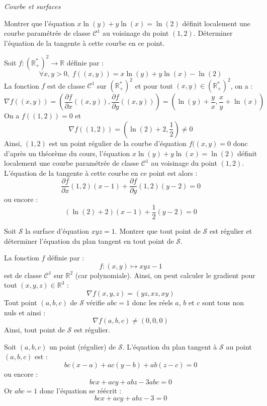 \documentclass[a4paper,10pt]{report}
\begin{document}
\medskip

\begin{center}
\textit{{ {\large Courbe et surfaces}}}
\end{center}

\medskip

\begin{Exercice}{} Montrer que l'équation $x\ln(y)+y \ln(x) = \ln(2)$ définit localement une courbe paramétrée de classe $\mathcal{C}^1$ au voisinage du point $(1,2)$. Déterminer l'équation de la tangente à cette courbe en ce point.
\end{Exercice}

\corr Soit $f : (\mathbb{R}_+^*)^2 \rightarrow \mathbb{R}$ définie par :
$$ \forall x,y>0, \; f((x,y))= x\ln(y)+y \ln(x) - \ln(2)$$
La fonction $f$ est de classe $\mathcal{C}^1$ sur  $(\mathbb{R}_+^*)^2$ et pour tout $(x,y) \in  (\mathbb{R}_+^*)^2$, on a :
$$ \nabla f ((x,y)) = \left( \dfrac{\partial f}{\partial x} ((x,y)),  \dfrac{\partial f}{\partial y} ((x,y)) \right) = \left( \ln(y) + \dfrac{y}{x}, \dfrac{x}{y} + \ln(x) \right)$$
On a $f((1,2))= 0$ et
$$ \nabla f ((1,2)) = \left( \ln(2)+2, \dfrac{1}{2} \right) \neq 0$$
Ainsi, $(1,2)$ est un point régulier de la courbe d'équation $f((x,y)=0$ donc d'après un théorème du cours, l'équation $x\ln(y)+y \ln(x) = \ln(2)$ définit localement une courbe paramétrée de classe $\mathcal{C}^1$ au voisinage du point $(1,2)$. L'équation de la tangente à cette courbe en ce point est alors :
$$  \dfrac{\partial f}{\partial  x}(1,2)(x-1) + \dfrac{\partial f}{\partial y}(1,2) (y-2)=0$$
ou encore :
$$  (\ln(2)+2) (x-1) + \dfrac{1}{2} (y-2)=0$$

\begin{Exercice}{} Soit $\mathcal{S}$ la surface d'équation $xyz=1$. Montrer que tout point de $\mathcal{S}$ est régulier et déterminer l'équation du plan tangent en tout point de $\mathcal{S}$.
\end{Exercice}

\corr La fonction $f$ définie par :
$$ f : (x,y) \mapsto xyz-1$$
est de classe $\mathcal{C}^1$ sur $\mathbb{R}^2$ (car polynomiale). Ainsi, on peut calculer le gradient pour tout $(x,y,z) \in \mathbb{R}^3$ :
$$ \nabla f(x,y,z)=(yz,xz,xy)$$
Tout point $(a,b,c)$ de $\mathcal{S}$ vérifie $abc=1$ donc les réels $a$, $b$ et $c$ sont tous non nuls et ainsi :
$$  \nabla f(a,b,c) \neq (0,0,0)$$
Ainsi, tout point de $\mathcal{S}$ est régulier. 

\medskip

\noindent Soit $(a,b,c)$ un point (régulier) de $\mathcal{S}$. L'équation du plan tangent à $\mathcal{S}$ au point $(a,b,c)$ est :
$$ bc(x-a)+ac(y-b)+ab(z-c)=0$$
ou encore :
$$ bcx+acy+abz -3abc=0$$
Or $abc=1$ donc l'équation se réécrit :
$$ bcx+acy+abz -3=0$$
\end{document}
